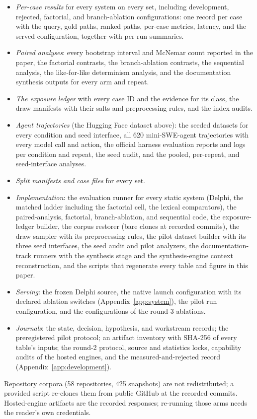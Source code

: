 \documentclass{article}
\newcommand{\system}{Delphi}
\begin{document}
\begin{itemize}[leftmargin=1.2em]
\item \emph{Per-case results} for every system on every set, including development, rejected, factorial, and branch-ablation configurations: one record per case with the query, gold paths, ranked paths, per-case metrics, latency, and the served configuration, together with per-run summaries.
\item \emph{Paired analyses}: every bootstrap interval and McNemar count reported in the paper, the factorial contrasts, the branch-ablation contrasts, the sequential analysis, the like-for-like determinism analysis, and the documentation synthesis outputs for every arm and repeat.
\item \emph{The exposure ledger} with every case ID and the evidence for its class, the draw manifests with their salts and preprocessing rules, and the index audits.
\item \emph{Agent trajectories} (the Hugging Face dataset above): the seeded datasets for every condition and seed interface, all 620 mini-SWE-agent trajectories with every model call and action, the official harness evaluation reports and logs per condition and repeat, the seed audit, and the pooled, per-repeat, and seed-interface analyses.
\item \emph{Split manifests and case files} for every set.
\item \emph{Implementation}: the evaluation runner for every static system (\system{}, the matched ladder including the factorial cell, the lexical comparators), the paired-analysis, factorial, branch-ablation, and sequential code, the exposure-ledger builder, the corpus restorer (bare clones at recorded commits), the draw sampler with its preprocessing rules, the pilot dataset builder with its three seed interfaces, the seed audit and pilot analyzers, the documentation-track runners with the synthesis stage and the synthesis-engine context reconstruction, and the scripts that regenerate every table and figure in this paper.
\item \emph{Serving}: the frozen \system{} source, the native launch configuration with its declared ablation switches (Appendix~\ref{app:system}), the pilot run configuration, and the configurations of the round-3 ablations.
\item \emph{Journals}: the state, decision, hypothesis, and workstream records; the preregistered pilot protocol; an artifact inventory with SHA-256 of every table's inputs; the round-2 protocol, source and statistics locks, capability audits of the hosted engines, and the measured-and-rejected record (Appendix~\ref{app:development}).
\end{itemize}

Repository corpora (58 repositories, 425 snapshots) are not redistributed; a provided script re-clones them from public GitHub at the recorded commits. Hosted-engine artifacts are the recorded responses; re-running those arms needs the reader's own credentials.
\end{document}
